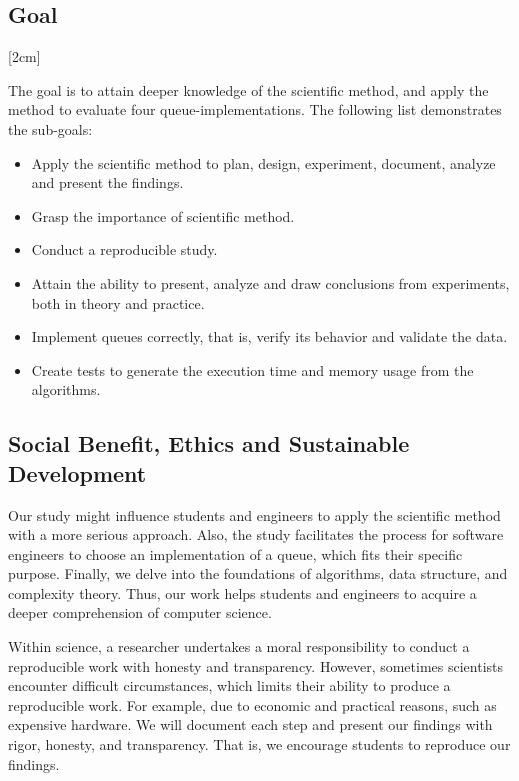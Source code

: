 \documentclass[a4paper,11pt]{kth-mag}
\newcommand*{\skippara}{\par\vspace{\baselineskip} \noindent}
\begin{document}
\subsection{Goal}\label{sec:goal}
[2cm]
\skippara The goal is to attain deeper knowledge of the scientific method, and apply the method to evaluate four queue-implementations.
The following list demonstrates the sub-goals:
\begin{itemize}
    \item Apply the scientific method to plan, design, experiment, document, analyze and present the findings.
    \item Grasp the importance of scientific method.
    \item Conduct a reproducible study.
    \item Attain the ability to present, analyze and draw conclusions from experiments, both in theory and practice.
    \item Implement queues correctly, that is, verify its behavior and validate the data.
    \item Create tests to generate the execution time and memory usage from the algorithms.
\end{itemize}

\subsection{Social Benefit, Ethics and Sustainable Development}
Our study might influence students and engineers to apply the scientific method with a more serious approach.
Also, the study facilitates the process for software engineers to choose an implementation of a queue, which fits their specific purpose.
Finally, we delve into the foundations of algorithms, data structure, and complexity theory.
Thus, our work helps students and engineers to acquire a deeper comprehension of computer science.

\skippara Within science, a researcher undertakes a moral responsibility to conduct a reproducible work with honesty and transparency.
However, sometimes scientists encounter difficult circumstances, which limits their ability to produce a reproducible work.
For example, due to economic and practical reasons, such as expensive hardware.
We will document each step and present our findings with rigor, honesty, and transparency.
That is, we encourage students to reproduce our findings.
\end{document}
